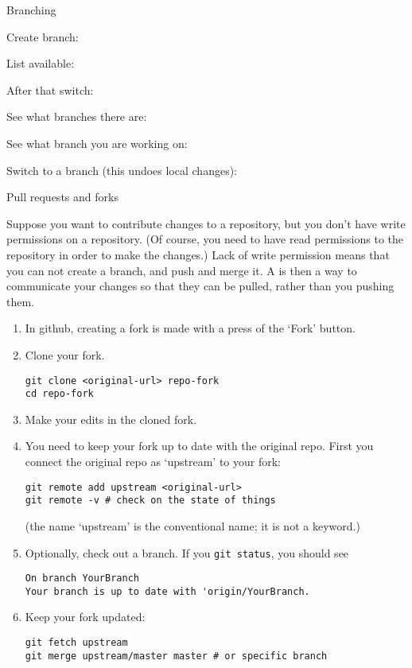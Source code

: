  {Branching}

Create branch:


List available:


After that switch:




See what branches there are: 

See what branch you are working on: 

Switch to a branch (this undoes local changes): 

 {Pull requests and forks}

Suppose you want to contribute changes to a repository,
but you don't have write permissions on a repository.
(Of course, you need to have read permissions to the repository
in order to make the changes.)
Lack of write permission means that you can not create a branch,
and push and merge it.
A  is then a way to communicate
your changes so that they can be pulled, rather
than you pushing them.

\begin{enumerate}
\item
  In github, creating a fork is made with a press of the `Fork' button.
\item
  Clone your fork.
\begin{verbatim}
git clone <original-url> repo-fork
cd repo-fork
\end{verbatim}
\item
  Make your edits in the cloned fork.
\item You need to keep your fork up to date with the original repo.
  First you connect the original repo as `upstream' to your fork:
\begin{verbatim}
git remote add upstream <original-url>
git remote -v # check on the state of things
\end{verbatim}
(the name `upstream' is the conventional name; it is not a keyword.)
\item
  Optionally, check out a branch. If you \texttt{git status}, you should see
\begin{verbatim}
On branch YourBranch
Your branch is up to date with 'origin/YourBranch.
\end{verbatim}
\item Keep your fork updated:
\begin{verbatim}
git fetch upstream
git merge upstream/master master # or specific branch
\end{verbatim}
\end{enumerate}

